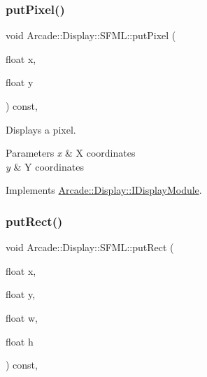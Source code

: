 \mbox{\label{classArcade_1_1Display_1_1SFML_a68417ef6b0450c6c7e6fa022699a2c3b}} 
\subsubsection{\texorpdfstring{putPixel()}{putPixel()}}
{\footnotesize\ttfamily void Arcade\+::\+Display\+::\+S\+F\+M\+L\+::put\+Pixel (\begin{DoxyParamCaption}\item[{float}]{x,  }\item[{float}]{y }\end{DoxyParamCaption}) const\hspace{0.3cm}{\ttfamily [final]}, {\ttfamily [virtual]}}



Displays a pixel. 


\begin{DoxyParams}{Parameters}
{\em x} & X coordinates \\
\hline
{\em y} & Y coordinates \\
\hline
\end{DoxyParams}


Implements \mbox{\hyperlink{classArcade_1_1Display_1_1IDisplayModule_a86a61eaa1d0cf2ddfdedbaa04054da90}{Arcade\+::\+Display\+::\+I\+Display\+Module}}.

\mbox{\label{classArcade_1_1Display_1_1SFML_a177bbd0afd21be8a66bc970b8007e7cd}} 
\subsubsection{\texorpdfstring{putRect()}{putRect()}}
{\footnotesize\ttfamily void Arcade\+::\+Display\+::\+S\+F\+M\+L\+::put\+Rect (\begin{DoxyParamCaption}\item[{float}]{x,  }\item[{float}]{y,  }\item[{float}]{w,  }\item[{float}]{h }\end{DoxyParamCaption}) const\hspace{0.3cm}{\ttfamily [final]}, {\ttfamily [virtual]}}



